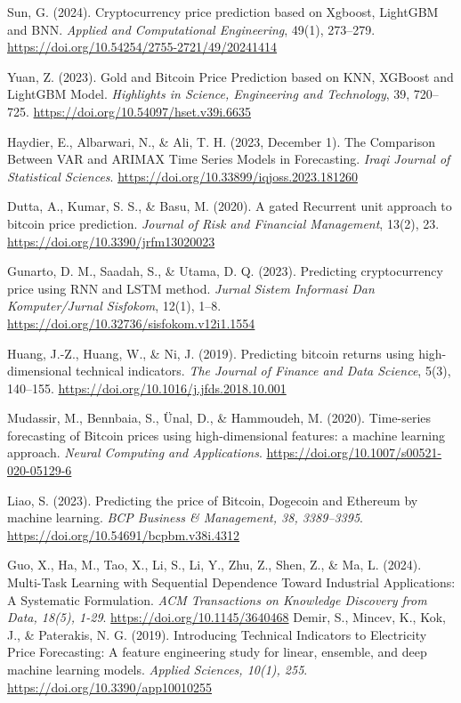 \documentclass{ieeeojies}
\begin{document}
\begin{thebibliography}{00}
     Sun, G. (2024). Cryptocurrency price prediction based on Xgboost, LightGBM and BNN. \textit{Applied and Computational Engineering}, 49(1), 273–279. \url{https://doi.org/10.54254/2755-2721/49/20241414}

     Yuan, Z. (2023). Gold and Bitcoin Price Prediction based on KNN, XGBoost and LightGBM Model. \textit{Highlights in Science, Engineering and Technology}, 39, 720–725. \url{https://doi.org/10.54097/hset.v39i.6635}

     Haydier, E., Albarwari, N., \& Ali, T. H. (2023, December 1). The Comparison Between VAR and ARIMAX Time Series Models in Forecasting. \textit{Iraqi Journal of Statistical Sciences}. \url{https://doi.org/10.33899/iqjoss.2023.181260}

     Dutta, A., Kumar, S. S., \& Basu, M. (2020). A gated Recurrent unit approach to bitcoin price prediction. \textit{Journal of Risk and Financial Management}, 13(2), 23. \url{https://doi.org/10.3390/jrfm13020023}

     Gunarto, D. M., Saadah, S., \& Utama, D. Q. (2023). Predicting cryptocurrency price using RNN and LSTM method. \textit{Jurnal Sistem Informasi Dan Komputer/Jurnal Sisfokom}, 12(1), 1–8. \url{https://doi.org/10.32736/sisfokom.v12i1.1554}

     Huang, J.-Z., Huang, W., \& Ni, J. (2019). Predicting bitcoin returns using high-dimensional technical indicators. \textit{The Journal of Finance and Data Science}, 5(3), 140–155. \url{https://doi.org/10.1016/j.jfds.2018.10.001}

     Mudassir, M., Bennbaia, S., Ünal, D., \& Hammoudeh, M. (2020). Time-series forecasting of Bitcoin prices using high-dimensional features: a machine learning approach. \textit{Neural Computing and Applications}. \url{https://doi.org/10.1007/s00521-020-05129-6}

     Liao, S. (2023). Predicting the price of Bitcoin, Dogecoin and Ethereum by machine learning. \textit{BCP Business \& Management, 38, 3389–3395}. \url{https://doi.org/10.54691/bcpbm.v38i.4312}

     Guo, X., Ha, M., Tao, X., Li, S., Li, Y., Zhu, Z., Shen, Z., \& Ma, L. (2024). Multi-Task Learning with Sequential Dependence Toward Industrial Applications: A Systematic Formulation. \textit{ACM Transactions on Knowledge Discovery from Data, 18(5), 1-29}. \url{https://doi.org/10.1145/3640468}
     Demir, S., Mincev, K., Kok, J., \& Paterakis, N. G. (2019). Introducing Technical Indicators to Electricity Price Forecasting: A feature engineering study for linear, ensemble, and deep machine learning models. \textit{Applied Sciences, 10(1), 255}. \url{https://doi.org/10.3390/app10010255}


\end{thebibliography}
\end{document}
